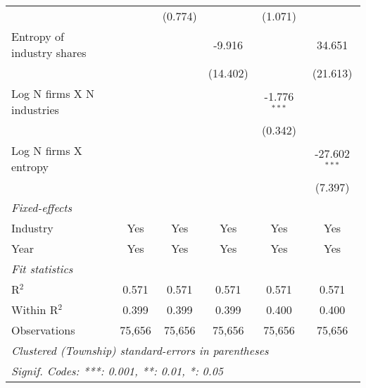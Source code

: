 \begin{tabular}{lccccc}
                                        &                  & (0.774)          &                  & (1.071)          &   \\   
   Entropy of industry shares           &                  &                  & -9.916           &                  & 34.651\\   
                                        &                  &                  & (14.402)         &                  & (21.613)\\   
   Log N firms X N industries           &                  &                  &                  & -1.776$^{***}$   &   \\   
                                        &                  &                  &                  & (0.342)          &   \\   
   Log N firms X entropy                &                  &                  &                  &                  & -27.602$^{***}$\\   
                                        &                  &                  &                  &                  & (7.397)\\   
   \midrule
   \emph{Fixed-effects}\\
   Industry                             & Yes              & Yes              & Yes              & Yes              & Yes\\  
   Year                                 & Yes              & Yes              & Yes              & Yes              & Yes\\  
   \midrule
   \emph{Fit statistics}\\
   R$^2$                                & 0.571            & 0.571            & 0.571            & 0.571            & 0.571\\  
   Within R$^2$                         & 0.399            & 0.399            & 0.399            & 0.400            & 0.400\\  
   Observations                         & 75,656           & 75,656           & 75,656           & 75,656           & 75,656\\  
   \midrule \midrule
   \multicolumn{6}{l}{\emph{Clustered (Township) standard-errors in parentheses}}\\
   \multicolumn{6}{l}{\emph{Signif. Codes: ***: 0.001, **: 0.01, *: 0.05}}\\
\end{tabular}
\par\endgroup
